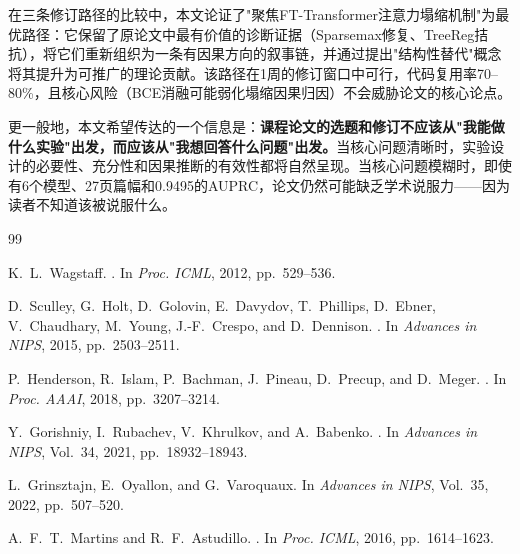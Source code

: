 \documentclass[UTF8,a4paper,12pt,fontset=fandol]{ctexart}
\begin{document}
在三条修订路径的比较中，本文论证了"聚焦FT-Transformer注意力塌缩机制"为最优路径：它保留了原论文中最有价值的诊断证据（Sparsemax修复、TreeReg拮抗），将它们重新组织为一条有因果方向的叙事链，并通过提出"结构性替代"概念将其提升为可推广的理论贡献。该路径在1周的修订窗口中可行，代码复用率70--80\%，且核心风险（BCE消融可能弱化塌缩因果归因）不会威胁论文的核心论点。

更一般地，本文希望传达的一个信息是：\textbf{课程论文的选题和修订不应该从"我能做什么实验"出发，而应该从"我想回答什么问题"出发。}当核心问题清晰时，实验设计的必要性、充分性和因果推断的有效性都将自然呈现。当核心问题模糊时，即使有6个模型、27页篇幅和0.9495的AUPRC，论文仍然可能缺乏学术说服力——因为读者不知道该被说服什么。

\begin{thebibliography}{99}

K.~L.~Wagstaff.
.
\newblock In \emph{Proc. ICML}, 2012, pp.~529--536.

D.~Sculley, G.~Holt, D.~Golovin, E.~Davydov, T.~Phillips, D.~Ebner, V.~Chaudhary, M.~Young, J.-F.~Crespo, and D.~Dennison.
.
\newblock In \emph{Advances in NIPS}, 2015, pp.~2503--2511.

P.~Henderson, R.~Islam, P.~Bachman, J.~Pineau, D.~Precup, and D.~Meger.
.
\newblock In \emph{Proc. AAAI}, 2018, pp.~3207--3214.

Y.~Gorishniy, I.~Rubachev, V.~Khrulkov, and A.~Babenko.
.
\newblock In \emph{Advances in NIPS}, Vol.~34, 2021, pp.~18932--18943.

L.~Grinsztajn, E.~Oyallon, and G.~Varoquaux.
\newblock In \emph{Advances in NIPS}, Vol.~35, 2022, pp.~507--520.

A.~F.~T.~Martins and R.~F.~Astudillo.
.
\newblock In \emph{Proc. ICML}, 2016, pp.~1614--1623.

\end{thebibliography}
\end{document}
